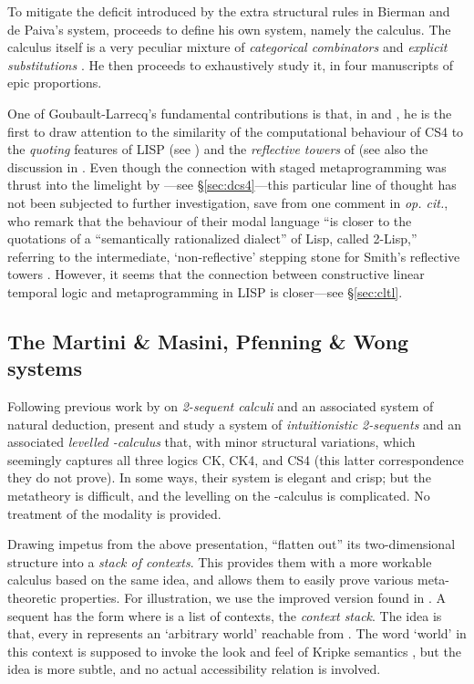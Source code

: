 \documentclass[a4paper]{amsart}
\begin{document}
To mitigate the deficit introduced by the extra structural rules
in Bierman and de Paiva's system,
\cite{Goubault-Larrecq1996, Goubault-Larrecq1996a,
Goubault-Larrecq1996b, Goubault-Larrecq1997} proceeds to define
his own system, namely the  calculus.
The calculus itself is a very peculiar mixture of
\emph{categorical combinators} \citep{Curien1993} and
\emph{explicit substitutions} \citep{Abadi1991}. He then proceeds
to exhaustively study it, in four manuscripts of epic proportions.

One of Goubault-Larrecq's fundamental contributions is that, in
\cite[\S 2]{Goubault-Larrecq1996} and \cite[\S
2.3]{Goubault-Larrecq1996a}, he is the first to draw attention to
the similarity of the computational behaviour of \textsf{CS4} to
the \emph{quoting} features of LISP (see \cite{Bawden1999}) and
the \emph{reflective towers} of \cite{Smith1984} (see also the
discussion in \cite{Goubault-Larrecq1997a}. Even though the
connection with staged metaprogramming was thrust into the
limelight by \cite{Davies2001a}---see \S \ref{sec:dcs4}---this
particular line of thought has not been subjected to further
investigation, save from one comment in \emph{op. cit.}, who
remark that the behaviour of their modal language ``is closer to
the quotations of a ``semantically rationalized dialect'' of Lisp,
called 2-Lisp,'' referring to the intermediate, `non-reflective'
stepping stone for Smith's reflective towers \citep{Smith1984}.
However, it seems that the connection between constructive linear
temporal logic and metaprogramming in LISP is closer---see
\S \ref{sec:cltl}.


\subsection{The Martini \& Masini, Pfenning \& Wong systems}


Following previous work by \cite{Masini1992, Masini1993} on
\emph{2-sequent calculi} and an associated system of natural
deduction, \cite{Martini1995} present and study a system of
\emph{intuitionistic 2-sequents} and an associated \emph{levelled
-calculus} that, with minor structural variations, which
seemingly captures all three logics \textsf{CK}, \textsf{CK4}, and
\textsf{CS4} (this latter correspondence they do not prove).
In some ways, their system is elegant and crisp; but the
metatheory is difficult, and the levelling on the
-calculus is complicated. No treatment of the 
modality is provided.

Drawing impetus from the above presentation, \cite{Pfenning1995}
``flatten out'' its two-dimensional structure into a \emph{stack
of contexts}. This provides them with a more workable calculus
based on the same idea, and allows them to easily prove various
meta-theoretic properties.  For illustration, we use the improved
version found in \cite[\S 5]{Davies2001a}. A sequent has the form
 where  is a list of contexts, the \emph{context stack}.
The idea is that, every  in  represents an `arbitrary world' reachable from
.  The word `world' in this context is supposed to
invoke the look and feel of Kripke semantics \citep{Kripke1963},
but the idea is more subtle, and no actual accessibility relation
is involved. 
\end{document}
